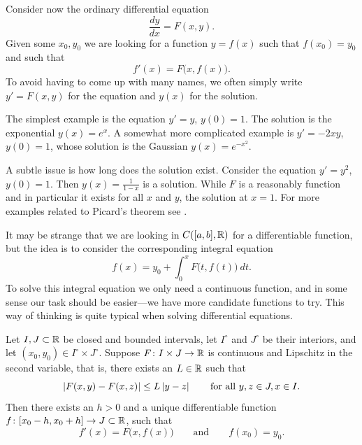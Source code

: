 \medskip

Consider now the ordinary differential equation
\begin{equation*}
\frac{dy}{dx} = F(x,y) .
\end{equation*}
Given some $x_0, y_0$ we are looking for a function $y=f(x)$ such that
$f(x_0) = y_0$ and such that
\begin{equation*}
f'(x) = F\bigl(x,f(x)\bigr) .
\end{equation*}
To avoid having to come up with many names, we often simply write $y' = F(x,y)$
for the equation
and $y(x)$ for the solution.

The simplest example is the equation $y' = y$, $y(0) = 1$.
The solution is the exponential $y(x) = e^x$.  A somewhat more complicated
example is $y' = -2xy$, $y(0) = 1$, whose solution is the Gaussian
$y(x) = e^{-x^2}$.

A subtle issue is how long does the solution exist.
Consider the equation $y' = y^2$, $y(0)=1$.  Then $y(x) = \frac{1}{1-x}$ is a
solution.  While $F$ is a reasonably  function and in particular
it exists for all $x$ and $y$, the solution  at $x=1$.
For more examples related to Picard's theorem see .

It may be strange that we are looking in $C([a,b],{\mathbb{R}})$ for a differentiable
function, but the idea is to consider the corresponding
integral equation
\begin{equation*}
f(x)
=
y_0 + \int_0^x F\bigl(t,f(t)\bigr)~dt .
\end{equation*}
To solve this integral equation we only need a continuous function, and
in some sense our task should be easier---we have more candidate functions
to try.  This way of thinking is quite typical when solving differential
equations.

\begin{samepage}
\begin{thm}%
Let $I, J \subset {\mathbb{R}}$ be closed and bounded intervals,
let $I^\circ$ and $J^\circ$ be their interiors, and 
let $(x_0,y_0) \in I^\circ \times J^\circ$.
Suppose $F \colon I \times J \to {\mathbb{R}}$ is continuous
and Lipschitz in the second variable, that is, there exists
an $L \in {\mathbb{R}}$ such that
\begin{equation*}
\left\lvert {F(x,y) - F(x,z)} \right\rvert \leq L \left\lvert {y-z} \right\rvert
\qquad \text{for all } y,z \in J, x \in I .
\end{equation*}
Then there exists an $h > 0$ and a unique differentiable
function $f \colon [x_0 - h, x_0 + h] \to J \subset {\mathbb{R}}$, such that
\begin{equation*}
f'(x) = F\bigl(x,f(x)\bigr) \qquad \text{and} \qquad f(x_0) = y_0.
\end{equation*}
\end{thm}
\end{samepage}

